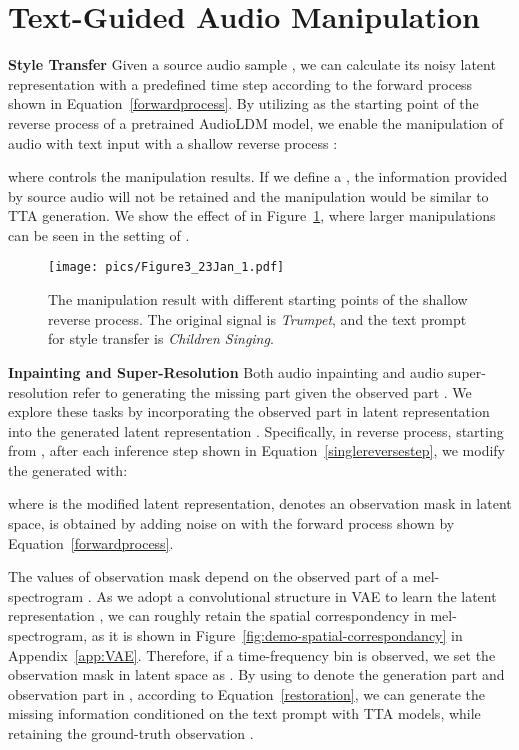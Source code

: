 \documentclass{article}
\begin{document}
\section{Text-Guided Audio Manipulation}
\label{AudioLDM}



\textbf{Style Transfer}
\label{AST}
Given a source audio sample , we can calculate its noisy latent representation  with a predefined time step  according to the forward process shown in Equation~\ref{forwardprocess}. By utilizing  as the starting point of the reverse process of a pretrained AudioLDM model, we enable the manipulation of audio  with text input  with a shallow reverse process :

where  controls the manipulation results. If we define a , the information provided by source audio will not be retained and the manipulation would be similar to TTA generation. We show the effect of  in Figure~\ref{fig:style-transfer-demo}, where larger manipulations can be seen in the setting of .

\begin{figure}[tbp]
    \centering
    \texttt{[image: pics/Figure3\_23Jan\_1.pdf]}
    \caption{The manipulation result with different starting points  of the shallow reverse process. The original signal is \textit{Trumpet}, and the text prompt for style transfer is \textit{Children Singing}.}
    \label{fig:style-transfer-demo}
\end{figure}

\textbf{Inpainting and Super-Resolution}
\label{AI}
Both audio inpainting and audio super-resolution refer to generating the missing part given the observed part . We explore these tasks by incorporating the observed part in latent representation  into the generated latent representation . Specifically, in reverse process, starting from , after each inference step shown in Equation~\ref{singlereversestep}, we modify the generated  with:

where  is the modified latent representation,  denotes an observation mask in latent space,  is obtained by adding noise on  with the forward process shown by Equation~\ref{forwardprocess}. 

The values of observation mask  depend on the observed part of a mel-spectrogram . As we adopt a convolutional structure in VAE to learn the latent representation , we can roughly retain the spatial correspondency in mel-spectrogram, as it is shown in Figure~\ref{fig:demo-spatial-correspondancy} in Appendix~\ref{app:VAE}. Therefore, if a time-frequency bin  is observed, we set the observation mask  in latent space as .
By using  to denote the generation part and observation part in , according to Equation~\ref{restoration}, we can generate the missing information conditioned on the text prompt with TTA models, while retaining the ground-truth observation .
\end{document}
